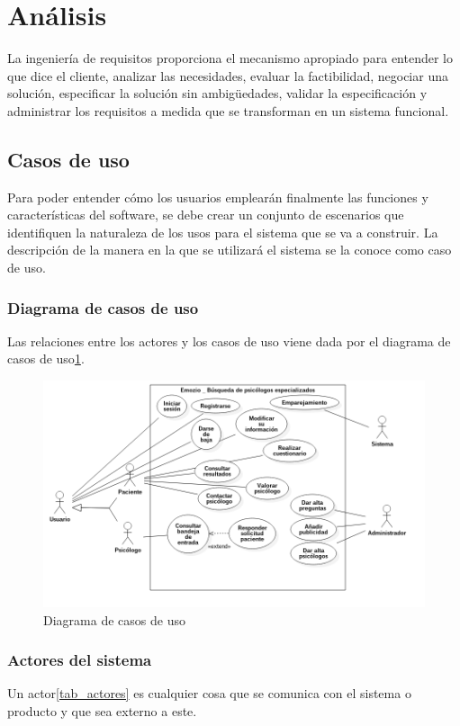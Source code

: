 \section{Análisis}

La ingeniería de requisitos proporciona el mecanismo apropiado para entender lo que dice el cliente, analizar las necesidades, evaluar la factibilidad, negociar una solución, especificar la solución sin ambigüedades, validar la especificación y administrar los requisitos a medida que se transforman en un sistema funcional\cite{pressman}.

\subsection{Casos de uso}
Para poder entender cómo los usuarios emplearán finalmente las funciones y características del software, se debe crear un conjunto de escenarios que identifiquen la naturaleza de los usos para el sistema que se va a construir. La descripción de la manera en la que se utilizará el sistema se la conoce como caso de uso.

\subsubsection{Diagrama de casos de uso}
Las relaciones entre los actores y los casos de uso viene dada por el diagrama de casos de uso\ref{fig:diag_casos_uso}.

\begin{figure}[htbp] 
    \centering
    \includegraphics[width=1\textwidth]{figuras/diag_casos_uso.png}
    \caption{Diagrama de casos de uso}
    \label{fig:diag_casos_uso}
\end{figure}	

\subsubsection{Actores del sistema}
Un actor\ref{tab_actores} es cualquier cosa que se comunica con el sistema o producto y que sea externo a este. 

